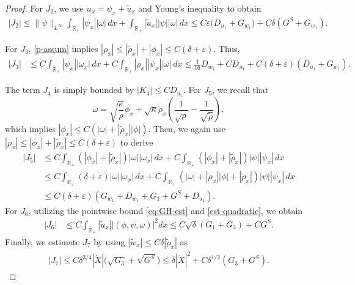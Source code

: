 \documentclass[11pt,reqno]{amsart}
\numberwithin{equation}{section} %
\newcommand{\e}{\varepsilon}
\begin{document}
\begin{proof}
For $J_2$, we use $u_x=\psi_x + \tilde{u}_x$ and Young's inequality to obtain
\begin{equation*}
\begin{aligned}
|J_2| \le \|\psi\|_{L^\infty} \int_{\mathbb{R}_+} |\psi_x| |\omega | \, dx + \int_{\mathbb{R}_+} |\tilde{u}_x| |\psi| |\omega| \, dx \le C \varepsilon \bigl( D_{u_1}+ G_{w_1} \bigr) + C \delta ( G^S +G_{w_1} ).
\end{aligned}
\end{equation*}

For $J_3$, \eqref{p-assum} implies $|\rho_x| \le |\tilde{\rho}_x|+|\phi_x| \le C(\delta + \varepsilon)$. Thus,
\begin{align*}
    |J_3| &\le C \int_{\mathbb{R}_+} |\psi_x||\omega_x| \, dx +  C \int_{\mathbb{R}_+} |\rho_x| |\psi_x| |\omega| \, dx\le \frac{1}{16} D_{w_1} + C D_{u_1} + C (\delta + \varepsilon) (D_{u_1} +G_{w_1}).
\end{align*}
 
The term $J_4$ is simply bounded by $ |K_4| \le C D_{u_1} $. For $J_5$, we recall that 
\[\omega = \sqrt{\frac{\kappa}{\rho}}\phi_x +\sqrt{\kappa}\tilde{\rho}_x\left(\frac{1}{\sqrt{\rho}}-\frac{1}{\sqrt{\tilde{\rho}}}\right),\]
which implies $|\phi_x|\le C(|\omega|+|\tilde{\rho}_x||\phi|)$. Then, we again use $|\rho_x|\le |\phi_x|+|\tilde{\rho}_x|\le  C(\delta+\e)$ to derive
\begin{align*}
|J_5| &\le  C \int_{\mathbb{R}_+}(|\phi_x|+|\tilde{\rho}_x| ) |\omega| |\omega_x| \, dx +C \int_{\mathbb{R}_+} (|\phi_x|+|\tilde{\rho}_x| ) |\psi| |\psi_x| \, dx \\
&\le C \int_{\mathbb{R}_+}(\delta+\e) |\omega| |\omega_x| \, dx +C \int_{\mathbb{R}_+} (|\omega|+|\tilde{\rho}_x||\phi|+|\tilde{\rho}_x| ) |\psi| |\psi_x| \, dx \\
&\le C (\delta + \varepsilon)( G_{w_1}+D_{w_1} + G_1+G^S+ D_{u_1}).
\end{align*}
For $J_6$, utilizing the pointwise bound \eqref{eq:GH-est} and \eqref{est-quadratic}, we obtain
\begin{equation*}
\begin{aligned}
|J_6| &\le C \int_{\mathbb{R}_+} |\tilde{u}_x| |(\phi,\psi,\omega)|^2 dx \le C \sqrt{\delta} (G_1+G_3) +CG^S.
\end{aligned}
\end{equation*}
Finally, we estimate $J_7$ by using $|\tilde{w}_x| \le C \delta | \tilde{\rho}_x|$ as
\begin{align*}
    |J_7| \le C \delta^{3/4} |\dot{X}| \bigl( \sqrt{G_3} + \sqrt{G^S} \bigr) \le  \delta |\dot{X}|^2  + C \delta^{1/2} ( G_3 +G^S).
\end{align*}


\end{proof}
\end{document}
